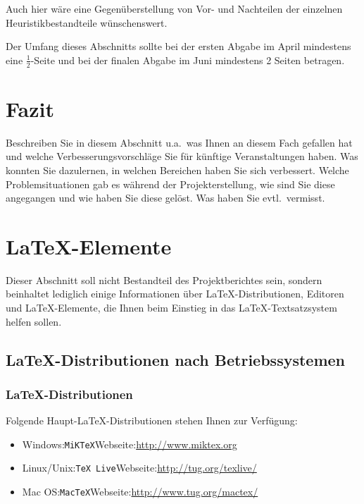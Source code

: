 \documentclass[12pt,a4paper,bibliography=totocnumbered,listof=totocnumbered]{article}
\begin{document}
Auch hier wäre eine Gegenüberstellung von Vor- und Nachteilen der einzelnen Heuristikbestandteile wünschenswert.

Der Umfang dieses Abschnitts sollte bei der ersten Abgabe im April mindestens eine $\frac{1}{2}$-Seite und bei der finalen Abgabe im Juni mindestens 2 Seiten betragen.

\newpage
\section{Fazit}
Beschreiben Sie in diesem Abschnitt u.a.\ was Ihnen an diesem Fach gefallen hat und welche Verbesserungsvorschläge Sie für künftige Veranstaltungen haben. Was konnten Sie dazulernen, in welchen Bereichen haben Sie sich verbessert. Welche Problemsituationen gab es während der Projekterstellung, wie sind Sie diese angegangen und wie haben Sie diese gelöst. Was haben Sie evtl.\ vermisst.


\newpage
\section{\LaTeX-Elemente}
Dieser Abschnitt soll nicht Bestandteil des Projektberichtes sein, sondern beinhaltet lediglich einige Informationen über \LaTeX-Distributionen, Editoren und \LaTeX-Elemente, die Ihnen beim Einstieg in das \LaTeX-Textsatzsystem helfen sollen.

\subsection{\LaTeX-Distributionen nach Betriebssystemen}

\subsubsection{\LaTeX-Distributionen}
Folgende Haupt-\LaTeX-Distributionen stehen Ihnen zur Verfügung:
\begin{itemize}
  \item Windows:\quad \texttt{MiKTeX}\quad Webseite:\quad\url{http://www.miktex.org}
  \item Linux/Unix:\quad \texttt{TeX Live}\quad Webseite:\quad\url{http://tug.org/texlive/}
  \item Mac OS:\quad \texttt{MacTeX}\quad Webseite:\quad\url{http://www.tug.org/mactex/}
\end{itemize}
\end{document}

